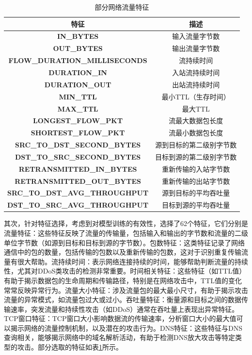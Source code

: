 \documentclass[promaster]{thesis-uestc}
\begin{document}
\begin{table}[h!]
    \centering
    \caption{部分网络流量特征}
    \begin{tabular}{c||c}
     \hline \hline
        \textbf{特征} & \textbf{描述} \\ \hline
        \textbf{IN\_BYTES} & 输入流量字节数 \\  \hline
        \textbf{OUT\_BYTES} & 输出流量字节数 \\  \hline
        \textbf{FLOW\_DURATION\_MILLISECONDS} & 流持续时间 \\  \hline
        \textbf{DURATION\_IN} & 入站流持续时间\\  \hline
        \textbf{DURATION\_OUT} & 出站流持续时间 \\  \hline
        \textbf{MIN\_TTL} & 最小TTL（生存时间） \\  \hline
        \textbf{MAX\_TTL} & 最大TTL \\  \hline
        \textbf{LONGEST\_FLOW\_PKT} & 流最大数据包长度 \\  \hline
        \textbf{SHORTEST\_FLOW\_PKT} & 流最小数据包长度 \\  \hline
        \textbf{SRC\_TO\_DST\_SECOND\_BYTES} & 源到目标的第二级别字节数 \\  \hline
        \textbf{DST\_TO\_SRC\_SECOND\_BYTES} & 目标到源的第二级别字节数 \\  \hline
        \textbf{RETRANSMITTED\_IN\_BYTES} & 重新传输的入站字节数 \\  \hline
        \textbf{RETRANSMITTED\_OUT\_BYTES} & 重新传输的出站字节数 \\  \hline
        \textbf{SRC\_TO\_DST\_AVG\_THROUGHPUT} & 源到目标的平均吞吐量 \\  \hline
        \textbf{DST\_TO\_SRC\_AVG\_THROUGHPUT} & 目标到源的平均吞吐量 \\ \hline \hline
    \end{tabular}
    \label{tbl:network_features}
\end{table}
其次，针对特征选择，考虑到对模型训练的有效性，选择了62个特征，它们分别是流量特征：这些特征反映了流量的传输量，包括输入和输出的字节数和流量的二级单位字节数（如源到目标和目标到源的字节数）。包数特征：这类特征记录了网络通信中的包的数量，包括传输的包数以及重新传输的包数，这对于识别重复传输流量有很大帮助。流持续时间：表示网络连接持续的时间，能够帮助判断流量的持续性，尤其对DDoS类攻击的检测非常重要。时间相关特征：这些特征（如TTL值）有助于揭示数据包的生命周期和传输路径，特别是在网络攻击中，TTL值的变化常常反映异常行为。流量大小特征：涉及流量包的最大最小尺寸，有助于揭示攻击流量的异常模式，如流量包过大或过小。吞吐量特征：衡量源和目标之间的数据传输速率，突发流量和持续性攻击（如DDoS）通常在吞吐量上表现出异常特征。TCP窗口特征：TCP窗口大小影响数据流的传输速率，分析窗口大小的最大值可以揭示网络的流量控制机制，以及潜在的攻击行为。DNS特征：这些特征与DNS查询相关，能够揭示网络中的域名解析活动，有助于检测DNS放大攻击等特定类型的攻击。部分选取的特征如表\ref{tbl:network_features}所示。
\end{document}
